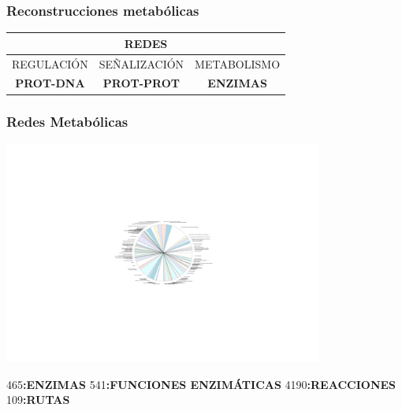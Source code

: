 \documentclass[10pt]{beamer}
\begin{document}
\begin{frame}
\frametitle{Reconstrucciones metabólicas}
\begin{center}
\begin{tabular}{|c|c|c|}
\hline
\multicolumn{3}{|c|}{\textbf{REDES}}\\
\hline
\hline
REGULACIÓN&SEÑALIZACIÓN&METABOLISMO\\
\hline
\textbf{PROT-DNA}&\textbf{PROT-PROT}& \textbf{ENZIMAS} \\
\hline
\end{tabular}
\end{center}
\end{frame}
\begin{frame}
\frametitle{Redes Metabólicas}
\begin{center}
\includegraphics[width=10.5cm]{imagenes/Met}
\end{center}
\begin{center}
465\textbf{:ENZIMAS} 541\textbf{:FUNCIONES ENZIMÁTICAS} 4190\textbf{:REACCIONES} 109\textbf{:RUTAS}
\end{center}
\end{frame}
\end{document}
